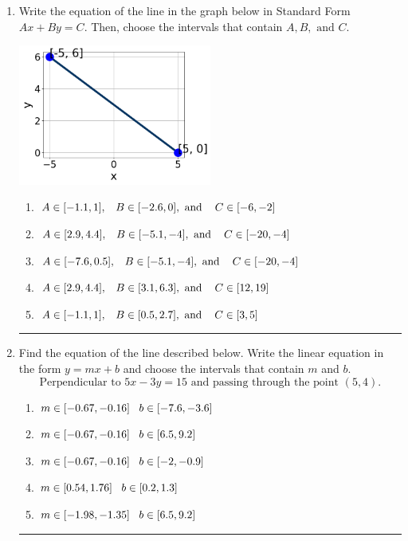 \documentclass[14pt]{extbook}
\newcommand{\litem}[1]{\item#1\hspace*{-1cm}\rule{\textwidth}{0.4pt}}
\begin{document}
\begin{enumerate}
{\begin{enumerate}[label=\Alph*.]
\end{enumerate} }
\litem{
Write the equation of the line in the graph below in Standard Form $Ax+By=C$. Then, choose the intervals that contain $A, B, \text{ and } C$.
\begin{center}
    \includegraphics[width=0.5\textwidth]{../Figures/linearGraphToStandardC.png}
\end{center}
\begin{enumerate}[label=\Alph*.]
\item \( A \in [-1.1, 1], \hspace{3mm} B \in [-2.6, 0], \text{ and } \hspace{3mm} C \in [-6, -2] \)
\item \( A \in [2.9, 4.4], \hspace{3mm} B \in [-5.1, -4], \text{ and } \hspace{3mm} C \in [-20, -4] \)
\item \( A \in [-7.6, 0.5], \hspace{3mm} B \in [-5.1, -4], \text{ and } \hspace{3mm} C \in [-20, -4] \)
\item \( A \in [2.9, 4.4], \hspace{3mm} B \in [3.1, 6.3], \text{ and } \hspace{3mm} C \in [12, 19] \)
\item \( A \in [-1.1, 1], \hspace{3mm} B \in [0.5, 2.7], \text{ and } \hspace{3mm} C \in [3, 5] \)

\end{enumerate} }
\litem{
Find the equation of the line described below. Write the linear equation in the form $ y=mx+b $ and choose the intervals that contain $m$ and $b$.\[ \text{Perpendicular to } 5 x - 3 y = 15 \text{ and passing through the point } (5, 4). \]\begin{enumerate}[label=\Alph*.]
\item \( m \in [-0.67, -0.16] \hspace*{3mm} b \in [-7.6, -3.6] \)
\item \( m \in [-0.67, -0.16] \hspace*{3mm} b \in [6.5, 9.2] \)
\item \( m \in [-0.67, -0.16] \hspace*{3mm} b \in [-2, -0.9] \)
\item \( m \in [0.54, 1.76] \hspace*{3mm} b \in [0.2, 1.3] \)
\item \( m \in [-1.98, -1.35] \hspace*{3mm} b \in [6.5, 9.2] \)


\end{enumerate}}
\end{enumerate}
\end{document}
